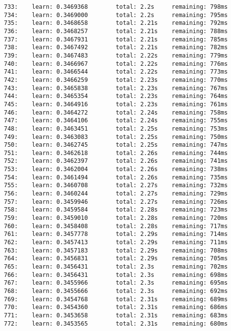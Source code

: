 \documentclass[11pt]{article}
\begin{document}
\begin{Verbatim}[commandchars=\\\{\}]
733:    learn: 0.3469368        total: 2.2s     remaining: 798ms
734:    learn: 0.3469000        total: 2.2s     remaining: 795ms
735:    learn: 0.3468658        total: 2.21s    remaining: 792ms
736:    learn: 0.3468257        total: 2.21s    remaining: 788ms
737:    learn: 0.3467931        total: 2.21s    remaining: 785ms
738:    learn: 0.3467492        total: 2.21s    remaining: 782ms
739:    learn: 0.3467483        total: 2.22s    remaining: 779ms
740:    learn: 0.3466967        total: 2.22s    remaining: 776ms
741:    learn: 0.3466544        total: 2.22s    remaining: 773ms
742:    learn: 0.3466259        total: 2.23s    remaining: 770ms
743:    learn: 0.3465838        total: 2.23s    remaining: 767ms
744:    learn: 0.3465354        total: 2.23s    remaining: 764ms
745:    learn: 0.3464916        total: 2.23s    remaining: 761ms
746:    learn: 0.3464272        total: 2.24s    remaining: 758ms
747:    learn: 0.3464106        total: 2.24s    remaining: 755ms
748:    learn: 0.3463451        total: 2.25s    remaining: 753ms
749:    learn: 0.3463083        total: 2.25s    remaining: 750ms
750:    learn: 0.3462745        total: 2.25s    remaining: 747ms
751:    learn: 0.3462618        total: 2.26s    remaining: 744ms
752:    learn: 0.3462397        total: 2.26s    remaining: 741ms
753:    learn: 0.3462004        total: 2.26s    remaining: 738ms
754:    learn: 0.3461494        total: 2.26s    remaining: 735ms
755:    learn: 0.3460708        total: 2.27s    remaining: 732ms
756:    learn: 0.3460244        total: 2.27s    remaining: 729ms
757:    learn: 0.3459946        total: 2.27s    remaining: 726ms
758:    learn: 0.3459584        total: 2.28s    remaining: 723ms
759:    learn: 0.3459010        total: 2.28s    remaining: 720ms
760:    learn: 0.3458408        total: 2.28s    remaining: 717ms
761:    learn: 0.3457778        total: 2.29s    remaining: 714ms
762:    learn: 0.3457413        total: 2.29s    remaining: 711ms
763:    learn: 0.3457183        total: 2.29s    remaining: 708ms
764:    learn: 0.3456831        total: 2.29s    remaining: 705ms
765:    learn: 0.3456431        total: 2.3s     remaining: 702ms
766:    learn: 0.3456431        total: 2.3s     remaining: 698ms
767:    learn: 0.3455966        total: 2.3s     remaining: 695ms
768:    learn: 0.3455666        total: 2.3s     remaining: 692ms
769:    learn: 0.3454768        total: 2.31s    remaining: 689ms
770:    learn: 0.3454360        total: 2.31s    remaining: 686ms
771:    learn: 0.3453658        total: 2.31s    remaining: 683ms
772:    learn: 0.3453565        total: 2.31s    remaining: 680ms

\end{Verbatim}
\end{document}
